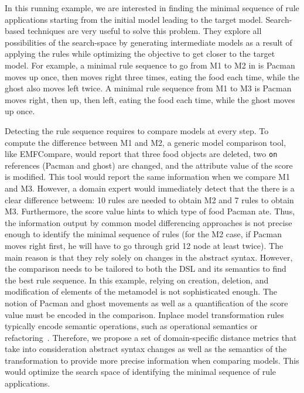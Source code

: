 In this running example, we are interested in finding the minimal sequence of rule applications starting from the initial model leading to the target model.
Search-based techniques are very useful to solve this problem.
They explore all possibilities of the search-space by generating intermediate models as a result of applying the rules while optimizing the objective to get closer to the target model.
For example, a minimal rule sequence to go from M1 to M2 in  is Pacman moves up once, then moves right three times, eating the food each time, while the ghost also moves left twice.
A minimal rule sequence from M1 to M3 is Pacman moves right, then up, then left, eating the food each time, while the ghost moves up once.

Detecting the rule sequence requires to compare models at every step.
To compute the difference between M1 and M2, a generic model comparison tool, like EMFCompare, would report that three food objects are deleted, two \texttt{on} references (Pacman and ghost) are changed, and the attribute value of the score is modified.
This tool would report the same information when we compare M1 and M3.
However, a domain expert would immediately detect that the there is a clear difference betweem: 10 rules are needed to obtain M2 and 7 rules to obtain M3.
Furthermore, the score value hints to which type of food Pacman ate.
Thus, the information output by common model differencing approaches is not precise enough to identify the minimal sequence of rules (\eg for the M2 case, if Pacman moves right first, he will have to go through grid 12 node at least twice).
The main reason is that they rely solely on changes in the abstract syntax.
However, the comparison needs to be tailored to both the DSL and its semantics to find the best rule sequence.
In this example, relying on creation, deletion, and modification of elements of the metamodel is not sophisticated enough.
The notion of Pacman and ghost movements as well as a quantification of the score value must be encoded in the comparison.
Inplace model transformation rules typically encode semantic operations, such as operational semantics or refactoring~\cite{Lucio2016}.
Therefore, we propose a set of domain-specific distance metrics that take into consideration abstract syntax changes as well as the semantics of the transformation to provide more precise information when comparing models.
This would optimize the search space of identifying the minimal sequence of rule applications.
%
%    
%    

